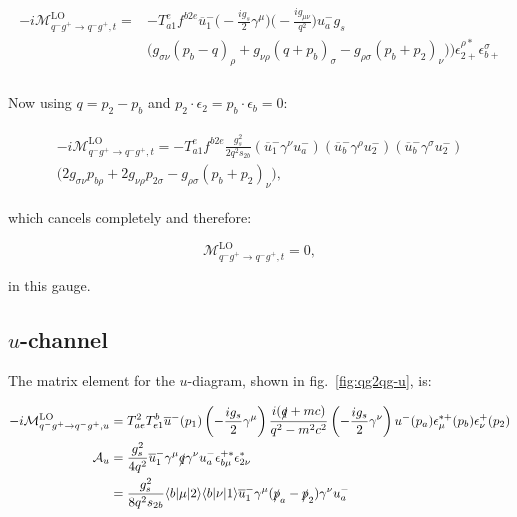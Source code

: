 		\begin{align}
		\begin{split}
			-i\mathcal{M}_{q^-g^+\to q^-g^+, t}^{\text{LO}} =
			&-T^e_{a1}f^{b2e}\overline{u}^-_1\Bigg(-\frac{ig_s}{2}\gamma^\mu\Bigg)\Bigg(-\frac{ig_{\mu\nu}}{q^2}\Bigg)u^-_ag_s\\
			&\Big(g_{\sigma\nu}(p_b-q)_\rho + g_{\nu\rho}(q+p_b)_\sigma - g_{\rho\sigma}(p_b+p_2)_\nu)\Big)\epsilon^{\rho *}_{2+}\epsilon^{\sigma}_{b+}\\
		\end{split}
		\end{align}

		Now using $q=p_2-p_b$ and $p_2\cdot\epsilon_2 = p_b\cdot\epsilon_b = 0$:

		\begin{align}
		\begin{split}
			-i\mathcal{M}_{q^-g^+\to q^-g^+, t}^{\text{LO}} =
		        -T^e_{a1}f^{b2e}\frac{g_s^2}{2q^2s_{2b}}\left(\overline{u}^-_1\gamma^{\nu}u^-_a\right)\left(\overline{u}^-_b\gamma^{\rho}u^-_2\right)\left(\overline{u}^-_b\gamma^{\sigma}u^-_2\right)\\
			\Big(2g_{\sigma\nu}p_{b\rho} + 2g_{\nu\rho}p_{2\sigma} - g_{\rho\sigma}(p_b+p_2)_\nu\Big),
		\end{split}
		\end{align}

		which cancels completely and therefore:

		\begin{equation}
			\mathcal{M}_{q^-g^+\to q^-g^+, t}^{\text{LO}}=0,
			\label{eqn:t-channel}
		\end{equation}

		in this gauge.

	\subsection{$u$-channel}

		The matrix element for the $u$-diagram, shown in fig.~\eqref{fig:qg2qg-u}, is:

		\begin{equation}
			\begin{split}
			-i\mathcal{M}_{q^-g^+\to q^-g^+, u}^{\text{LO}} &= T^2_{ae}T^b_{e1}\overline{u}^-(p_1)\left(-\frac{ig_s}{2}\gamma^\mu\right)
			\frac{i(\slashed q+mc)}{q^2-m^2c^2}\left(-\frac{ig_s}{2}\gamma^\nu\right)u^-(p_a)\epsilon_\mu^{*+}(p_b)\epsilon^+_\nu(p_2)\\
			\mathcal{A}_u &= \frac{g_s^2}{4q^2}\overline{u}^-_1\gamma^\mu\slashed q\gamma^\nu u^-_a\epsilon^{+*}_{b\mu}\epsilon^*_{2\nu}\\
			&= \frac{g_s^2}{8q^2s_{2b}}\langle b|\mu|2\rangle\langle b|\nu|1\rangle\overline{u}^-_1\gamma^\mu(\slashed{p}_a-\slashed{p}_2)\gamma^\nu u^-_a\\
			\end{split}
		\end{equation}

